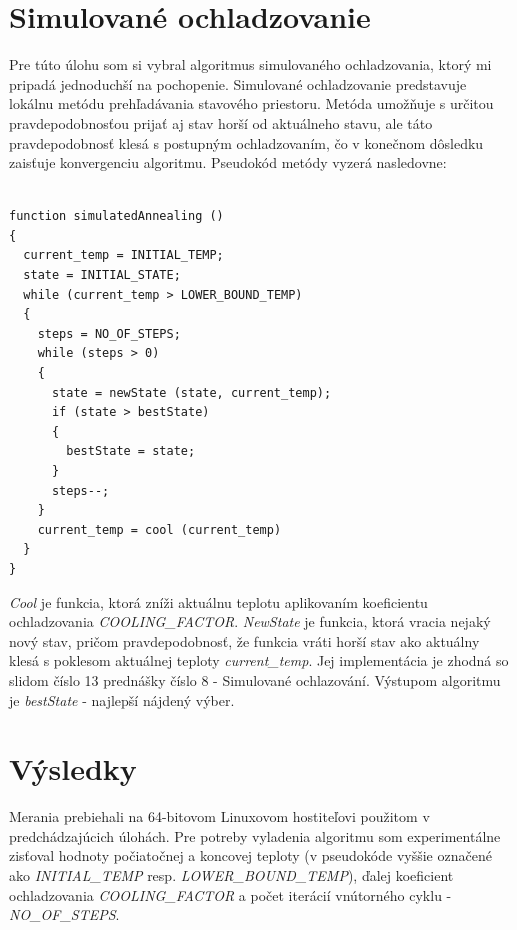 \documentclass[slovak]{article}
\begin{document}
\section{Simulované ochladzovanie}

Pre túto úlohu som si vybral algoritmus simulovaného ochladzovania, ktorý mi pripadá jednoduchší na pochopenie. Simulované ochladzovanie predstavuje lokálnu metódu prehľadávania stavového priestoru. Metóda umožňuje s určitou pravdepodobnosťou prijať aj stav horší od aktuálneho stavu, ale táto pravdepodobnosť klesá s postupným ochladzovaním, čo v konečnom dôsledku zaisťuje konvergenciu algoritmu. Pseudokód metódy vyzerá nasledovne:

\begin{lstlisting}

function simulatedAnnealing ()
{
  current_temp = INITIAL_TEMP;
  state = INITIAL_STATE;
  while (current_temp > LOWER_BOUND_TEMP)
  {
    steps = NO_OF_STEPS;
    while (steps > 0)
    {
      state = newState (state, current_temp);
      if (state > bestState)
      {
        bestState = state;
      }
      steps--;
    }
    current_temp = cool (current_temp)
  }
}

\end{lstlisting}

\emph{Cool} je funkcia, ktorá zníži aktuálnu teplotu aplikovaním koeficientu ochladzovania \emph{COOLING\_FACTOR}. \emph{NewState} je funkcia, ktorá vracia nejaký nový stav, pričom pravdepodobnosť, že funkcia vráti horší stav ako aktuálny klesá s poklesom aktuálnej teploty \emph{current\_temp}. Jej implementácia je zhodná so slidom číslo 13 prednášky číslo 8 - Simulované ochlazování. Výstupom algoritmu je \emph{bestState} - najlepší nájdený výber.

\section{Výsledky}

Merania prebiehali na 64-bitovom Linuxovom hostiteľovi použitom v predchádzajúcich úlohách. Pre potreby vyladenia algoritmu som experimentálne zisťoval hodnoty počiatočnej a koncovej teploty (v pseudokóde vyššie označené ako \emph{INITIAL\_TEMP} resp. \emph{LOWER\_BOUND\_TEMP}), ďalej koeficient ochladzovania \emph{COOLING\_FACTOR} a počet iterácií vnútorného cyklu - \emph{NO\_OF\_STEPS}. 
\end{document}
